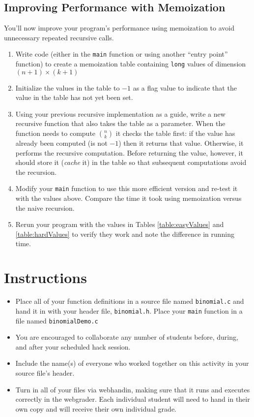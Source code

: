 \documentclass[12pt]{scrartcl}
\begin{document}
\subsection*{Improving Performance with Memoization}

You'll now improve your program's performance using memoization
to avoid unnecessary repeated recursive calls.  

\begin{enumerate}
  \item Write code (either in the \texttt{main} function or 
  using another ``entry point'' function) to create a memoization table 
  containing \texttt{long} values of dimension $(n+1) \times (k+1)$
  \item Initialize the values in the table to $-1$ as a flag value
  to indicate that the value in the table has not yet been set.
  \item Using your previous recursive implementation as a guide, write
  a new recursive function that also takes the table as a parameter.
  When the function needs to compute ${n \choose k}$ it checks the table
  first: if the value has already been computed (is not $-1$) then it
  returns that value.  Otherwise, it performs the recursive computation.
  Before returning the value, however, it should store it (\emph{cache}
  it) in the table so that subsequent computations avoid the recursion.  
  \item Modify your \texttt{main} function to use this more
  efficient version and re-test it with the values above.  Compare the
  time it took using memoization versus the naive recursion.
  \item Rerun your program with the values in Tables \ref{table:easyValues} 
  and \ref{table:hardValues} to verify they work and note the difference
  in running time.  
\end{enumerate}

\section*{Instructions}

\begin{itemize}

  \item Place all of your function definitions in a source file named 
  \texttt{binomial.c} and hand it in with your header file, 
  \texttt{binomial.h}.  Place your \texttt{main} 
  function in a file named \texttt{binomialDemo.c} 

  \item You are encouraged to collaborate any number of students 
  before, during, and after your scheduled hack session.  

  \item Include the name(s) of everyone who worked together on
  this activity in your source file's header.

  \item Turn in all of your files via webhandin, making sure that 
  it runs and executes correctly in the webgrader.  Each individual 
  student will need to hand in their own copy and will receive 
  their own individual grade.
\end{itemize}  
\end{document}
